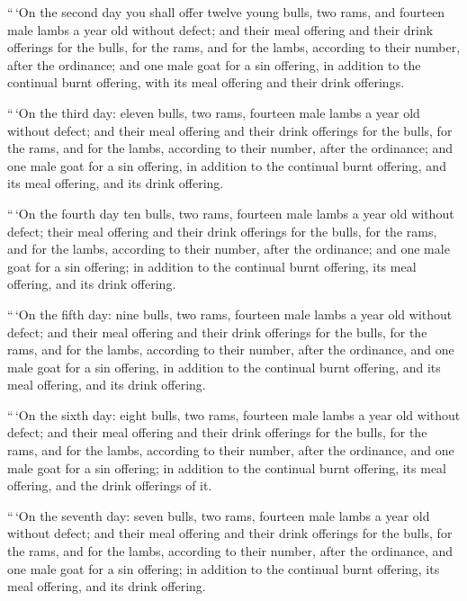  ``\,`On the second day you shall offer twelve young bulls,
two rams, and fourteen male lambs a year old without defect;
 and their meal offering and their drink offerings for the
bulls, for the rams, and for the lambs, according to their number, after
the ordinance;  and one male goat for a sin offering, in
addition to the continual burnt offering, with its meal offering and
their drink offerings.

 ``\,`On the third day: eleven bulls, two rams, fourteen
male lambs a year old without defect;  and their meal
offering and their drink offerings for the bulls, for the rams, and for
the lambs, according to their number, after the ordinance; 
and one male goat for a sin offering, in addition to the continual burnt
offering, and its meal offering, and its drink offering.

 ``\,`On the fourth day ten bulls, two rams, fourteen male
lambs a year old without defect;  their meal offering and
their drink offerings for the bulls, for the rams, and for the lambs,
according to their number, after the ordinance;  and one
male goat for a sin offering; in addition to the continual burnt
offering, its meal offering, and its drink offering.

 ``\,`On the fifth day: nine bulls, two rams, fourteen male
lambs a year old without defect;  and their meal offering
and their drink offerings for the bulls, for the rams, and for the
lambs, according to their number, after the ordinance,  and
one male goat for a sin offering, in addition to the continual burnt
offering, and its meal offering, and its drink offering.

 ``\,`On the sixth day: eight bulls, two rams, fourteen
male lambs a year old without defect;  and their meal
offering and their drink offerings for the bulls, for the rams, and for
the lambs, according to their number, after the ordinance, 
and one male goat for a sin offering; in addition to the continual burnt
offering, its meal offering, and the drink offerings of it.

 ``\,`On the seventh day: seven bulls, two rams, fourteen
male lambs a year old without defect;  and their meal
offering and their drink offerings for the bulls, for the rams, and for
the lambs, according to their number, after the ordinance, 
and one male goat for a sin offering; in addition to the continual burnt
offering, its meal offering, and its drink offering.

